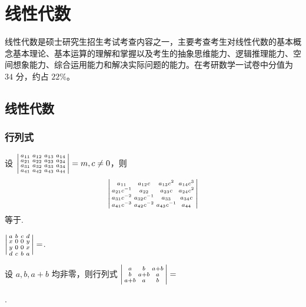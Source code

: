 \chapter{线性代数}
	线性代数是硕士研究生招生考试考查内容之一，主要考查考生对线性代数的基本概念基本理论、基本运算的理解和掌握以及考生的抽象思维能力、逻辑推理能力、空间想象能力、综合运用能力和解决实际问题的能力。在考研数学一试卷中分值为 $34$ 分，约占 $22\%$。
\section{线性代数}
	\subsection{行列式}

	\begin{titwo}
		设 $\begin{vsmallmatrix}
			a_{11} & a_{12} & a_{13} & a_{14}\\
			a_{21} & a_{22} & a_{23} & a_{24}\\
			a_{31} & a_{32} & a_{33} & a_{34}\\
			a_{41} & a_{42} & a_{43} & a_{44}
		\end{vsmallmatrix} = m, c \ne 0$，则 
		\[
			\begin{vsmallmatrix}
				a_{11} & a_{12}c & a_{13}c^{2} & a_{14}c^{3}\\
				a_{21}c^{-1} & a_{22} & a_{23}c & a_{24}c^{2}\\
				a_{31}c^{-2} & a_{32}c^{-1} & a_{33} & a_{34}c\\
				a_{41}c^{-3} & a_{42}c^{-2} & a_{43}c^{-1} & a_{44}
			\end{vsmallmatrix}
		\]
		等于\kuo.

	\end{titwo}

	\begin{titwo}
		$\begin{vsmallmatrix}
			a & b & c & d \\
			x & 0 & 0 & y \\
			y & 0 & 0 & x \\
			d & c & b & a
		\end{vsmallmatrix} = $\htwo.
	\end{titwo}

	\begin{titwo}
		设 $a, b, a + b$ 均非零，则行列式 $\begin{vsmallmatrix}
			a & b & a + b \\
			b & a + b & a \\
			a + b & a & b \\
		\end{vsmallmatrix} = $
		
		\noindent\htwo.
	\end{titwo}

